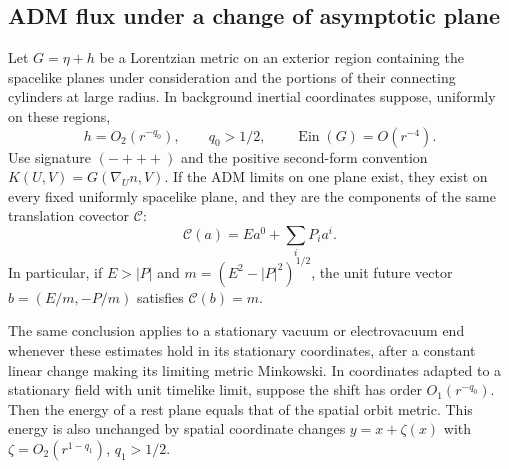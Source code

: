 \subsection{ADM flux under a change of asymptotic plane}

\begin{lemma}\label{en:adm-flux}
Let $G=\eta+h$ be a Lorentzian metric on an exterior region containing
the spacelike planes under consideration and the portions of their
connecting cylinders at large radius. In background inertial
coordinates suppose, uniformly on these regions,
\[
 h=O_2(r^{-q_0}),\qquad q_0>1/2,\qquad
 \operatorname{Ein}(G)=O(r^{-4}).
\]
Use signature $(-+++)$ and the positive second-form convention
$K(U,V)=G(\nabla_U n,V)$. If the ADM limits on one plane exist,
they exist on every fixed uniformly spacelike plane, and they are the
components of the same translation covector $\mathcal C$:
\begin{equation}\label{en:translation-covector}
 \mathcal C(a)=E a^0+\sum_iP_i a^i.
\end{equation}
In particular, if $E>|P|$ and $m=(E^2-|P|^2)^{1/2}$, the unit
future vector $b=(E/m,-P/m)$ satisfies $\mathcal C(b)=m$.

The same conclusion applies to a stationary vacuum or electrovacuum
end whenever these estimates hold in its stationary coordinates,
after a constant linear change making its limiting metric Minkowski.
In coordinates adapted to a stationary field with unit timelike
limit, suppose the shift has order $O_1(r^{-q_0})$.
Then the energy of a rest plane equals that of the spatial orbit
metric. This energy is also unchanged by spatial coordinate changes
$y=x+\zeta(x)$ with
$\zeta=O_2(r^{1-q_1})$, $q_1>1/2$.
\end{lemma}

